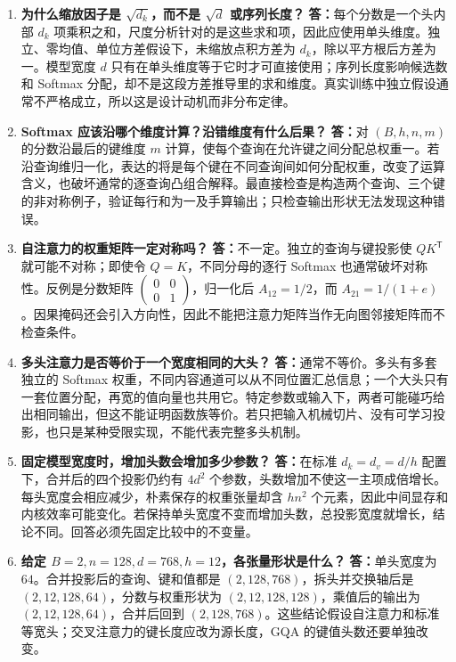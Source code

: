 \documentclass[UTF8,12pt,a4paper,fontset=fandol]{ctexart}
\begin{document}
\begin{enumerate}[resume*=trquestions]
\item \textbf{为什么缩放因子是 $\sqrt{d_k}$，而不是 $\sqrt d$ 或序列长度？}
\textbf{答：}每个分数是一个头内部 $d_k$ 项乘积之和，尺度分析针对的是这些求和项，因此应使用单头维度。独立、零均值、单位方差假设下，未缩放点积方差为 $d_k$，除以平方根后方差为一。模型宽度 $d$ 只有在单头维度等于它时才可直接使用；序列长度影响候选数和 Softmax 分配，却不是这段方差推导里的求和维度。真实训练中独立假设通常不严格成立，所以这是设计动机而非分布定律。

\item \textbf{Softmax 应该沿哪个维度计算？沿错维度有什么后果？}
\textbf{答：}对 $(B,h,n,m)$ 的分数沿最后的键维度 $m$ 计算，使每个查询在允许键之间分配总权重一。若沿查询维归一化，表达的将是每个键在不同查询间如何分配权重，改变了运算含义，也破坏通常的逐查询凸组合解释。最直接检查是构造两个查询、三个键的非对称例子，验证每行和为一及手算输出；只检查输出形状无法发现这种错误。

\item \textbf{自注意力的权重矩阵一定对称吗？}
\textbf{答：}不一定。独立的查询与键投影使 $QK^{\mathsf T}$ 就可能不对称；即使令 $Q=K$，不同分母的逐行 Softmax 也通常破坏对称性。反例是分数矩阵 $\left(\begin{smallmatrix}0&0\\0&1\end{smallmatrix}\right)$，归一化后 $A_{12}=1/2$，而 $A_{21}=1/(1+e)$。因果掩码还会引入方向性，因此不能把注意力矩阵当作无向图邻接矩阵而不检查条件。

\item \textbf{多头注意力是否等价于一个宽度相同的大头？}
\textbf{答：}通常不等价。多头有多套独立的 Softmax 权重，不同内容通道可以从不同位置汇总信息；一个大头只有一套位置分配，再宽的值向量也共用它。特定参数或输入下，两者可能碰巧给出相同输出，但这不能证明函数族等价。若只把输入机械切片、没有可学习投影，也只是某种受限实现，不能代表完整多头机制。

\item \textbf{固定模型宽度时，增加头数会增加多少参数？}
\textbf{答：}在标准 $d_k=d_v=d/h$ 配置下，合并后的四个投影仍约有 $4d^2$ 个参数，头数增加不使这一主项成倍增长。每头宽度会相应减少，朴素保存的权重张量却含 $hn^2$ 个元素，因此中间显存和内核效率可能变化。若保持单头宽度不变而增加头数，总投影宽度就增长，结论不同。回答必须先固定比较中的不变量。

\item \textbf{给定 $B=2,n=128,d=768,h=12$，各张量形状是什么？}
\textbf{答：}单头宽度为 $64$。合并投影后的查询、键和值都是 $(2,128,768)$，拆头并交换轴后是 $(2,12,128,64)$，分数与权重形状为 $(2,12,128,128)$，乘值后的输出为 $(2,12,128,64)$，合并后回到 $(2,128,768)$。这些结论假设自注意力和标准等宽头；交叉注意力的键长度应改为源长度，GQA 的键值头数还要单独改变。


\end{enumerate}
\end{document}

